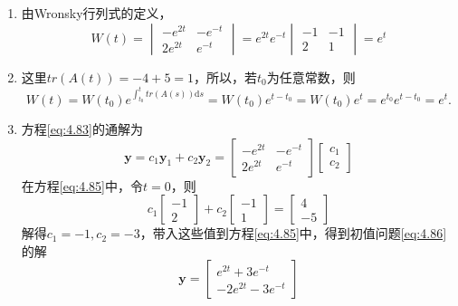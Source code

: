 \begin{solution}
    \begin{enumerate}[label=\alph*)]
        \item 由Wronsky行列式的定义，
              \[
                  W(t)=\begin{vmatrix}
                      -e^{2t} & -e^{-t} \\
                      2e^{2t} & e^{-t}
                  \end{vmatrix}=e^{2t}e^{-t}\begin{vmatrix}
                      -1 & -1 \\
                      2  & 1
                  \end{vmatrix}=e^t
              \]
        \item 这里$tr(A(t))=-4+5=1$，所以，若$t_0$为任意常数，则
              \[
                  W(t)=W(t_0)e^{\int_{t_0}^t tr(A(s))\mathrm{d}s}=W(t_0)e^{t-t_0}=W(t_0)e^t=e^{t_0}e^{t-t_0}=e^t.
              \]
        \item 方程\ref{eq:4.83}的通解为
              \begin{equation}\label{eq:4.85}
                  \mathbf{y}=c_1\mathbf{y}_1+c_2\mathbf{y}_2=\begin{bmatrix}
                      -e^{2t} & -e^{-t} \\
                      2e^{2t} & e^{-t}
                  \end{bmatrix}\begin{bmatrix}
                      c_1 \\
                      c_2
                  \end{bmatrix}
              \end{equation}
              在方程\ref{eq:4.85}中，令$t=0$，则
              \[
                  c_1\begin{bmatrix}
                      -1 \\
                      2
                  \end{bmatrix}+c_2\begin{bmatrix}
                      -1 \\
                      1
                  \end{bmatrix}=\begin{bmatrix}
                      4 \\
                      -5
                  \end{bmatrix}
              \]
              解得$c_1=-1,c_2=-3$，带入这些值到方程\ref{eq:4.85}中，得到初值问题\ref{eq:4.86}的解
              \[
                  \mathbf{y}=\begin{bmatrix}
                      e^{2t}+3e^{-t} \\
                      -2e^{2t}-3e^{-t}
                  \end{bmatrix}
              \]
    \end{enumerate}
\end{solution}

